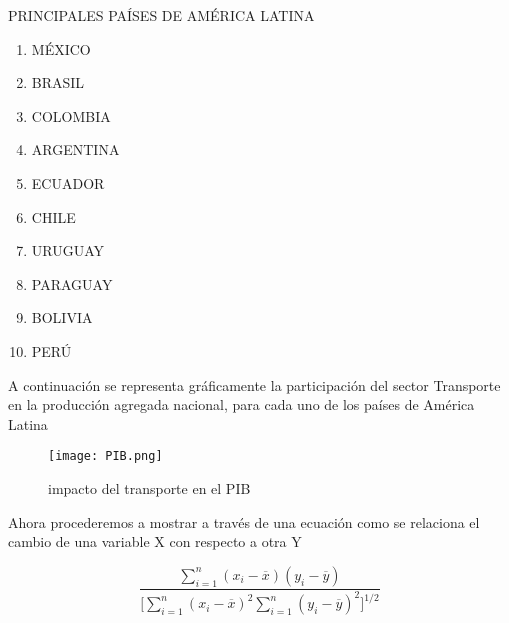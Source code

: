 \documentclass[a4paper,11pt]{article}
\begin{document}
\begin{center}
 PRINCIPALES PAÍSES DE AMÉRICA LATINA 
\end{center}

\begin{enumerate}

\item MÉXICO
 \item BRASIL
 \item COLOMBIA 
 \item ARGENTINA
 \item ECUADOR
 \item CHILE
 \item URUGUAY
 \item PARAGUAY
 \item BOLIVIA
 \item PERÚ
 
\end{enumerate}
\begin{flushleft}

A continuación se representa gráficamente la participación del sector Transporte en la producción agregada nacional, para cada uno de los países de América Latina 

\end{flushleft}
 

\begin{figure}[h]
\graphicspath{ {images/} }
\begin{center}
\texttt{[image: PIB.png]}
\end{center}
\caption{impacto del transporte en el PIB}
\label{fig:1}
\end{figure}

Ahora procederemos a mostrar a través de una ecuación como se relaciona el cambio de una variable X con respecto a otra Y 

\begin{displaymath}
\frac{\displaystyle
\sum_{i=1}^n(x_i-\overline x)(y_i-\overline y)}
{\displaystyle\biggl[\sum_{i=1}^n(x_i-\overline x)^2\sum_{i=1}^n(y_i-\overline y)^2
\biggr]^{1/2}}
\end{displaymath}
\end{document}
